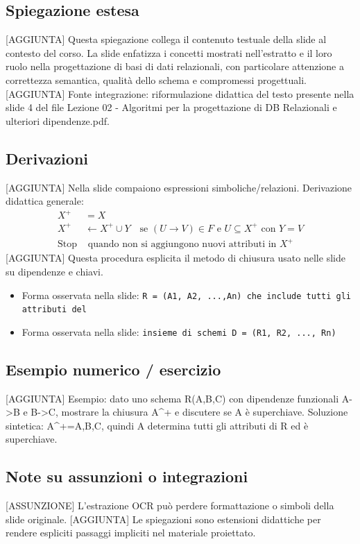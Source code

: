 \documentclass[11pt]{article}
\begin{document}
\subsection*{Spiegazione estesa}
[AGGIUNTA] Questa spiegazione collega il contenuto testuale della slide al contesto del corso. La slide enfatizza i concetti mostrati nell'estratto e il loro ruolo nella progettazione di basi di dati relazionali, con particolare attenzione a correttezza semantica, qualità dello schema e compromessi progettuali.
[AGGIUNTA] Fonte integrazione: riformulazione didattica del testo presente nella slide 4 del file Lezione 02 - Algoritmi per la progettazione di DB Relazionali e ulteriori dipendenze.pdf.
\subsection*{Derivazioni}
[AGGIUNTA] Nella slide compaiono espressioni simboliche/relazioni. Derivazione didattica generale:
\begin{align*}
X^+ &= X \\
X^+ &\leftarrow X^+ \cup Y \quad \text{se } (U \to V) \in F \text{ e } U \subseteq X^+ \text{ con } Y=V \\
\text{Stop} &\text{ quando non si aggiungono nuovi attributi in } X^+
\end{align*}
[AGGIUNTA] Questa procedura esplicita il metodo di chiusura usato nelle slide su dipendenze e chiavi.
\begin{itemize}[leftmargin=*]
\item Forma osservata nella slide: \texttt{R = (A1, A2, ...,An) che include tutti gli attributi del}
\item Forma osservata nella slide: \texttt{insieme di schemi D = (R1, R2, ..., Rn)}
\end{itemize}
\subsection*{Esempio numerico / esercizio}
[AGGIUNTA] Esempio: dato uno schema R(A,B,C) con dipendenze funzionali A->B e B->C, mostrare la chiusura A^+ e discutere se A è superchiave. Soluzione sintetica: A^+={A,B,C}, quindi A determina tutti gli attributi di R ed è superchiave.
\subsection*{Note su assunzioni o integrazioni}
[ASSUNZIONE] L'estrazione OCR può perdere formattazione o simboli della slide originale.
[AGGIUNTA] Le spiegazioni sono estensioni didattiche per rendere espliciti passaggi impliciti nel materiale proiettato.
\end{document}
